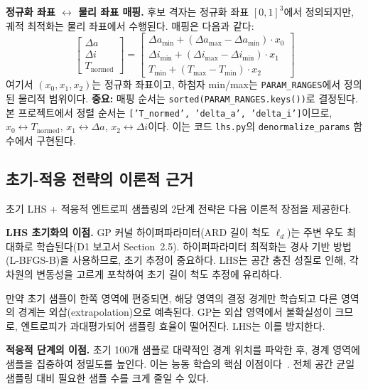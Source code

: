 \documentclass[11pt]{article}
\begin{document}
\textbf{정규화 좌표 $\leftrightarrow$ 물리 좌표 매핑.} 후보 격자는 정규화 좌표 $[0,1]^3$에서 정의되지만, 궤적 최적화는 물리 좌표에서 수행된다. 매핑은 다음과 같다:
\begin{equation}\label{eq:coord-mapping}
\begin{bmatrix} \Delta a \\ \Delta i \\ T_{\text{normed}} \end{bmatrix} = \begin{bmatrix} \Delta a_{\min} + (\Delta a_{\max} - \Delta a_{\min}) \cdot x_0 \\ \Delta i_{\min} + (\Delta i_{\max} - \Delta i_{\min}) \cdot x_1 \\ T_{\min} + (T_{\max} - T_{\min}) \cdot x_2 \end{bmatrix}
\end{equation}
여기서 $(x_0, x_1, x_2)$는 정규화 좌표이고, 하첨자 min/max는 \texttt{PARAM\_RANGES}에서 정의된 물리적 범위이다. \textbf{중요:} 매핑 순서는 \texttt{sorted(PARAM\_RANGES.keys())}로 결정된다. 본 프로젝트에서 정렬 순서는 \texttt{['T\_normed', 'delta\_a', 'delta\_i']}이므로, $x_0 \leftrightarrow T_{\text{normed}}$, $x_1 \leftrightarrow \Delta a$, $x_2 \leftrightarrow \Delta i$이다. 이는 코드 \texttt{lhs.py}의 \texttt{denormalize\_params} 함수에서 구현된다.


\subsection{초기-적응 전략의 이론적 근거}

초기 LHS + 적응적 엔트로피 샘플링의 2단계 전략은 다음 이론적 장점을 제공한다.

\textbf{LHS 초기화의 이점.} GP 커널 하이퍼파라미터(ARD 길이 척도 $\ell_d$)는 주변 우도 최대화로 학습된다(D1 보고서 Section~2.5). 하이퍼파라미터 최적화는 경사 기반 방법(L-BFGS-B)을 사용하므로, 초기 추정이 중요하다. LHS는 공간 충진 성질로 인해, 각 차원의 변동성을 고르게 포착하여 초기 길이 척도 추정에 유리하다.

만약 초기 샘플이 한쪽 영역에 편중되면, 해당 영역의 결정 경계만 학습되고 다른 영역의 경계는 외삽(extrapolation)으로 예측된다. GP는 외삽 영역에서 불확실성이 크므로, 엔트로피가 과대평가되어 샘플링 효율이 떨어진다. LHS는 이를 방지한다.

\textbf{적응적 단계의 이점.} 초기 100개 샘플로 대략적인 경계 위치를 파악한 후, 경계 영역에 샘플을 집중하여 정밀도를 높인다. 이는 능동 학습의 핵심 이점이다~\cite{Settles2009}. 전체 공간 균일 샘플링 대비 필요한 샘플 수를 크게 줄일 수 있다.
\end{document}
